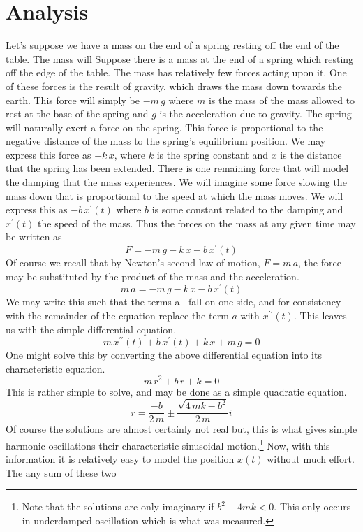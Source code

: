\documentclass[11pt]{article}
\begin{document}
\section{Analysis}
Let’s suppose we have a mass on the end of a spring resting off the end of the table. The mass will Suppose there is a mass at the end of a spring which resting off the edge of the table. The mass has relatively few forces acting upon it. One of these forces is the result of gravity, which draws the mass down towards the earth. This force will simply be \(- m \, g\) where \( m \) is the mass of the mass allowed to rest at the base of the spring and \( g \) is the acceleration due to gravity. The spring will naturally exert a force on the spring. This force is proportional to the negative distance of the mass to the spring’s equilibrium position. We may express this force as \( - k \, x \), where \( k \) is the spring constant and \( x \) is the distance that the spring has been extended. There is one remaining force that will model the damping that the mass experiences. We will imagine some force slowing the mass down that is proportional to the speed at which the mass moves. We will express this as \( - b \, x^{\prime}(t)\) where \(b\) is some constant related to the damping and \(x^{\prime}(t)\) the speed of the mass. Thus the forces on the mass at any given time may be written as
\[ F = - m \, g - k \, x - b \, x^{\prime}(t) \]
Of course we recall that by Newton's second law of motion, \(F = m \, a\), the force may be substituted by the product of the mass and the acceleration.
\[ m \, a = - m \, g - k \, x - b \, x^{\prime}(t) \]
We may write this such that the terms all fall on one side, and for consistency with the remainder of the equation replace the term \(a \) with \(x^{\prime\prime}(t)\). This leaves us with the simple differential equation.
\[ m \, x^{\prime \prime}(t) + b \, x^{\prime}(t) + k \, x  + m \, g  = 0\]
One might solve this by converting the above differential equation into its characteristic equation.
\[m \, r^2 + b \, r + k = 0 \]
This is rather simple to solve, and may be done as a simple quadratic equation.
\[ r  = \frac{-b}{2 \,m} \pm \frac{\sqrt{4 \, m k - b^2}}{2 \, m} i\]
Of course the solutions are almost certainly not real but, this is what gives simple harmonic oscillations their characteristic sinusoidal motion.\footnote{Note that the solutions are only imaginary if \( b^2 - 4mk < 0\). This only occurs in underdamped oscillation which is what was measured.} Now, with this information it is relatively easy to model the position \(x(t)\) without much effort. The any sum of these two 
\end{document}
